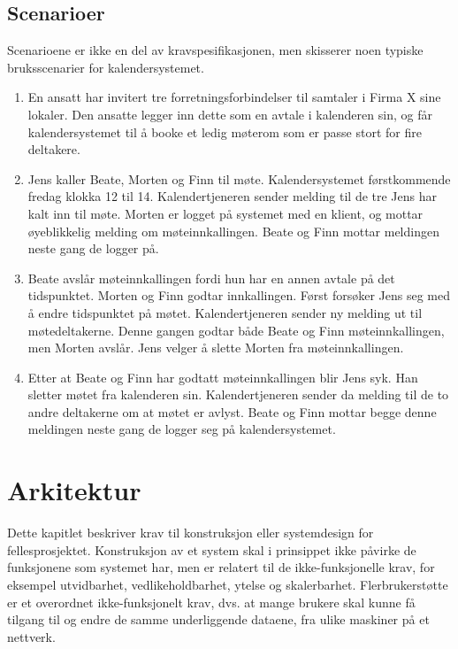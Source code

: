 \documentclass[a4paper]{scrartcl}
\begin{document}
\subsection{Scenarioer}

Scenarioene er ikke en del av kravspesifikasjonen, men skisserer noen typiske bruksscenarier for kalendersystemet.

\begin{enumerate}

\item
En ansatt har invitert tre forretningsforbindelser til samtaler i Firma X sine lokaler. Den ansatte legger inn dette som en avtale i kalenderen sin, og får kalendersystemet til å booke et ledig møterom som er passe stort for fire deltakere.

\item
Jens kaller Beate, Morten og Finn til møte. Kalendersystemet  førstkommende fredag klokka 12 til 14. Kalendertjeneren sender melding til de tre Jens har kalt inn til møte. Morten er logget på systemet med en klient, og mottar øyeblikkelig melding om møteinnkallingen. Beate og Finn mottar meldingen neste gang de logger på.

\item
Beate avslår møteinnkallingen fordi hun har en annen avtale på det tidspunktet. Morten og Finn godtar innkallingen. Først forsøker Jens seg med å endre tidspunktet på møtet. Kalendertjeneren sender ny melding ut til møtedeltakerne. Denne gangen godtar både Beate og Finn møteinnkallingen, men Morten avslår. Jens velger å slette Morten fra møteinnkallingen. 

\item
Etter at Beate og Finn har godtatt møteinnkallingen blir Jens syk. Han sletter møtet fra kalenderen sin. Kalendertjeneren sender da melding til de to andre deltakerne om at møtet er avlyst. Beate og Finn mottar begge denne meldingen neste gang de logger seg på kalendersystemet.

\end{enumerate}

\newpage
\section{Arkitektur}
Dette kapitlet beskriver krav til konstruksjon eller systemdesign for fellesprosjektet. Konstruksjon av et system skal i prinsippet ikke påvirke de funksjonene som systemet har, men er relatert til de ikke-funksjonelle krav, for eksempel utvidbarhet, vedlikeholdbarhet, ytelse og skalerbarhet. Flerbrukerstøtte er et overordnet ikke-funksjonelt krav, dvs. at mange brukere skal kunne få tilgang til og endre de samme underliggende dataene, fra ulike maskiner på et nettverk.
\end{document}
